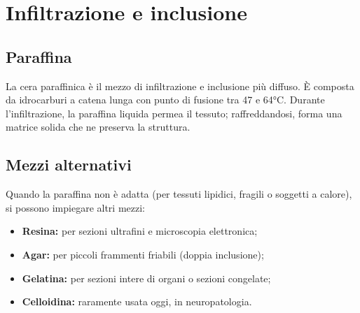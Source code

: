 \section{Infiltrazione e inclusione}

\subsection{Paraffina}
La cera paraffinica è il mezzo di infiltrazione e inclusione più diffuso. È composta da idrocarburi a catena lunga con punto di fusione tra 47 e 64°C.  
Durante l’infiltrazione, la paraffina liquida permea il tessuto; raffreddandosi, forma una matrice solida che ne preserva la struttura.


\subsection{Mezzi alternativi}
Quando la paraffina non è adatta (per tessuti lipidici, fragili o soggetti a calore), si possono impiegare altri mezzi:
\begin{itemize}
    \item \textbf{Resina:} per sezioni ultrafini e microscopia elettronica;
    \item \textbf{Agar:} per piccoli frammenti friabili (doppia inclusione);
    \item \textbf{Gelatina:} per sezioni intere di organi o sezioni congelate;
    \item \textbf{Celloidina:} raramente usata oggi, in neuropatologia.
\end{itemize}







